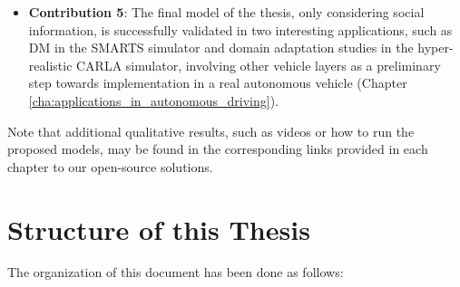 \begin{itemize}
	\item \textbf{Contribution 5}: The final model of the thesis, only considering social information, is successfully validated in two interesting applications, such as \ac{DM} in the SMARTS simulator and domain adaptation studies in the hyper-realistic CARLA simulator, involving other vehicle layers as a preliminary step towards implementation in a real autonomous vehicle (Chapter \ref{cha:applications_in_autonomous_driving}). 
	 
\end{itemize}

Note that additional qualitative results, such as videos or how to run the proposed models, may be found in the corresponding links provided in each chapter to our open-source solutions.

\section{Structure of this Thesis}
\label{sec:1_structure}

The organization of this document has been done as follows:

